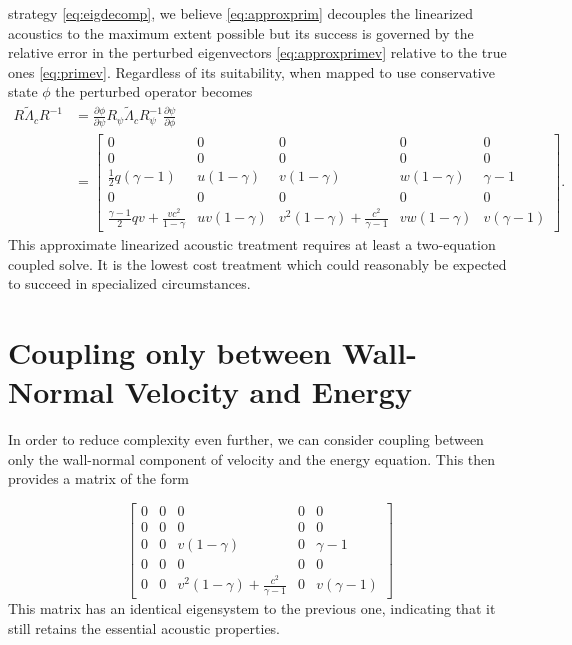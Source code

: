 \documentclass[letterpaper,11pt,nointlimits,reqno]{amsart}
\begin{document}
strategy \eqref{eq:eigdecomp}, we believe \eqref{eq:approxprim} decouples the
linearized acoustics to the maximum extent possible but its success is governed
by the relative error in the perturbed eigenvectors \eqref{eq:approxprimev}
relative to the true ones \eqref{eq:primev}.  Regardless of its suitability,
when mapped to use conservative state $\phi$ the perturbed operator becomes
\begin{align}
  R \tilde\Lambda_c R^{-1}
  &=
  \frac{\partial \phi}{\partial \psi}
  R_\psi \tilde\Lambda_c R_\psi^{-1}
  \frac{\partial \psi}{\partial \phi}
\\
 &=
\begin{bmatrix}
 0 & 0 & 0 & 0 & 0 \\
 0 & 0 & 0 & 0 & 0 \\
 \frac{1}{2} q (\gamma-1) & u(1-\gamma)  & v(1-\gamma)  & w(1-\gamma)  & \gamma-1  \\
 0 & 0 & 0 & 0 & 0 \\
 \frac{\gamma-1}{2} q v +\frac{v c^2}{1-\gamma} & u v (1-\gamma ) & v^2 (1-\gamma)+\frac{c^2}{\gamma-1} & v w (1-\gamma ) & v (\gamma-1 )
\end{bmatrix}
.
\end{align}
This approximate linearized acoustic treatment requires at least a two-equation
coupled solve.  It is the lowest cost treatment which could reasonably be
expected to succeed in specialized circumstances.

\section{Coupling only between Wall-Normal Velocity and Energy}

In order to reduce complexity even further, we can consider coupling between only the wall-normal 
component of velocity and the energy equation. This then provides a matrix of the form

\begin{equation}\label{eq:reduced}
 \begin{bmatrix}
 0 & 0 & 0 & 0 & 0 \\
 0 & 0 & 0 & 0 & 0 \\
 0 & 0 & v(1-\gamma)  & 0 & \gamma-1  \\
 0 & 0 & 0 & 0 & 0 \\
 0 & 0 & v^2 (1-\gamma)+\frac{c^2}{\gamma-1} & 0 & v (\gamma-1 )
\end{bmatrix}
\end{equation}
This matrix has an identical eigensystem to the previous one, indicating that it still retains the essential acoustic properties. 
\end{document}

